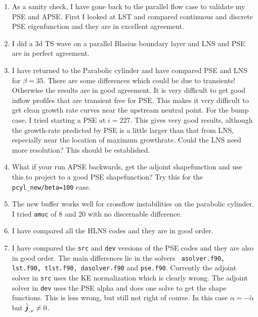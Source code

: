 \documentclass[12pt]{article}
\begin{document}
\begin{enumerate}
\item As a sanity check, I have gone back to the parallel flow case to
validate my PSE and APSE.  First I looked at LST and compared continuous and
discrete PSE eigenfunction and they are in excellent agreement.

\item I did a 3d TS wave on a parallel Blasius boundary layer and LNS and PSE
are in perfect agreement.

\item I have returned to the Parabolic cylinder and have compared PSE and LNS
for $\beta=35$.  There are some differences which could be due to transients!
Otherwise the results are in good agreement.  It is very difficult to get good
inflow profiles that are transient free for PSE.  This makes it very difficult
to get clean growth rate curves near the upstream neutral point.  For the bump
case, I tried starting a PSE at $i=227$.  This gives very good results,
although the growth-rate predicted by PSE is a little larger than that from
LNS, especially near the location of maximum growthrate.  Could the LNS need
more resolution?  This should be established.

\item What if your run APSE backwards, get the adjoint shapefunction and use
this to project to a good PSE shapefunction?  Try this for the {\tt
pcyl\_new/beta=100} case.

\item The new buffer works well for crossflow instabilities on the parabolic
cylinder.  I tried {\tt amuc} of 8 and 20 with no discernable difference.

\item I have compared all the HLNS codes and they are in good order.

\item I have compared the {\tt src} and {\tt dev} versions of the PSE codes
and they are also in good order.  The main differences lie in the solvers {\tt
asolver.f90, lst.f90, tlst.f90, dasolver.f90} and {\tt pse.f90}.  Currently
the adjoint solver in {\tt src} uses the KE normalization which is clearly
wrong.  The adjoint solver in {\tt dev} uses the PSE alpha and does one solve
to get the shape functions.  This is less wrong, but still not right of
course.  In this case $\alpha = -\tilde\alpha$ but $\hat{{\boldsymbol j}}_{,x} \ne 0$.

\end{enumerate}
\end{document}
